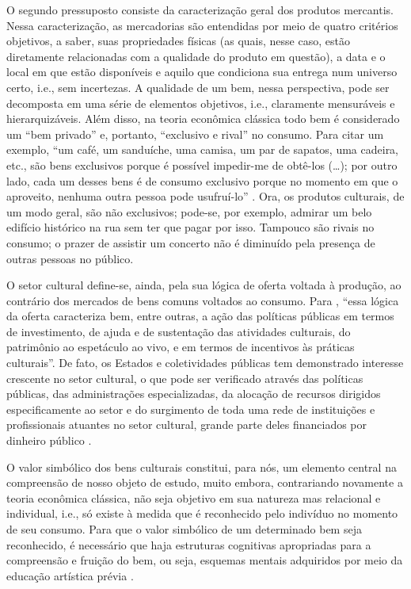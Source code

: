 \documentclass[a4paper, 12pt, openright, oneside, german, french, english, brazil]{abntex2}
\begin{document}
	O segundo pressuposto consiste da caracterização geral dos produtos mercantis. Nessa caracterização, as mercadorias são entendidas por meio de quatro critérios objetivos, a saber, suas propriedades físicas (as quais, nesse caso, estão diretamente relacionadas com a qualidade do produto em questão), a data e o local em que estão disponíveis e aquilo que condiciona sua entrega num universo certo, i.e., sem incertezas. A qualidade de um bem, nessa perspectiva, pode ser decomposta em uma série de elementos objetivos, i.e., claramente mensuráveis e hierarquizáveis. Além disso, na teoria econômica clássica todo bem é considerado um ``bem privado'' e, portanto, ``exclusivo e rival'' no consumo. Para citar um exemplo, ``um café, um sanduíche, uma camisa, um par de sapatos, uma cadeira, etc., são bens exclusivos porque é possível impedir-me de obtê-los (\ldots); por outro lado, cada um desses bens é de consumo exclusivo porque no momento em que o aproveito, nenhuma outra pessoa pode usufruí-lo'' \cite[p. 29]{tolila2007cultura}. Ora, os produtos culturais, de um modo geral, são não exclusivos; pode-se, por exemplo, admirar um belo edifício histórico na rua sem ter que pagar por isso. Tampouco são rivais no consumo; o prazer de assistir um concerto não é diminuído pela presença de outras pessoas no público.
	
	O setor cultural define-se, ainda, pela sua lógica de oferta voltada à produção, ao contrário dos mercados de bens comuns voltados ao consumo. Para , ``essa lógica da oferta caracteriza bem, entre outras, a ação das políticas públicas em termos de investimento, de ajuda e de sustentação das atividades culturais, do patrimônio ao espetáculo ao vivo, e em termos de incentivos às práticas culturais''. De fato, os Estados e coletividades públicas tem demonstrado interesse crescente no setor cultural, o que pode ser verificado através das políticas públicas, das administrações especializadas, da alocação de recursos dirigidos especificamente ao setor e do surgimento de toda uma rede de instituições e profissionais atuantes no setor cultural, grande parte deles financiados por dinheiro público \cite{tolila2007cultura}.
	
	O valor simbólico dos bens culturais constitui, para nós, um elemento central na compreensão de nosso objeto de estudo, muito embora, contrariando novamente a teoria econômica clássica, não seja objetivo em sua natureza mas relacional e individual, i.e., só existe à medida que é reconhecido pelo indivíduo no momento de seu consumo. Para que o valor simbólico de um determinado bem seja reconhecido, é necessário que haja estruturas cognitivas apropriadas para a compreensão e fruição do bem, ou seja, esquemas mentais adquiridos por meio da educação artística prévia \cite{bourdieu2003amor}.
	
\end{document}
